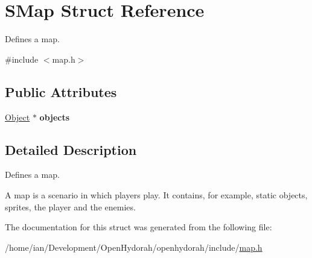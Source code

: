 \hypertarget{structSMap}{\section{S\-Map Struct Reference}
\label{structSMap}
}


Defines a map.  




{\ttfamily \#include $<$map.\-h$>$}

\subsection*{Public Attributes}
\begin{DoxyCompactItemize}
\item 
\hypertarget{structSMap_a4ce4ec813049d81f6aede29683f76d10}{\hyperlink{structSObject}{Object} $\ast$ {\bfseries objects}}\label{structSMap_a4ce4ec813049d81f6aede29683f76d10}

\end{DoxyCompactItemize}


\subsection{Detailed Description}
Defines a map. 

A map is a scenario in which players play. It contains, for example, static objects, sprites, the player and the enemies. 

The documentation for this struct was generated from the following file\-:\begin{DoxyCompactItemize}
\item 
/home/ian/\-Development/\-Open\-Hydorah/openhydorah/include/\hyperlink{map_8h}{map.\-h}\end{DoxyCompactItemize}
